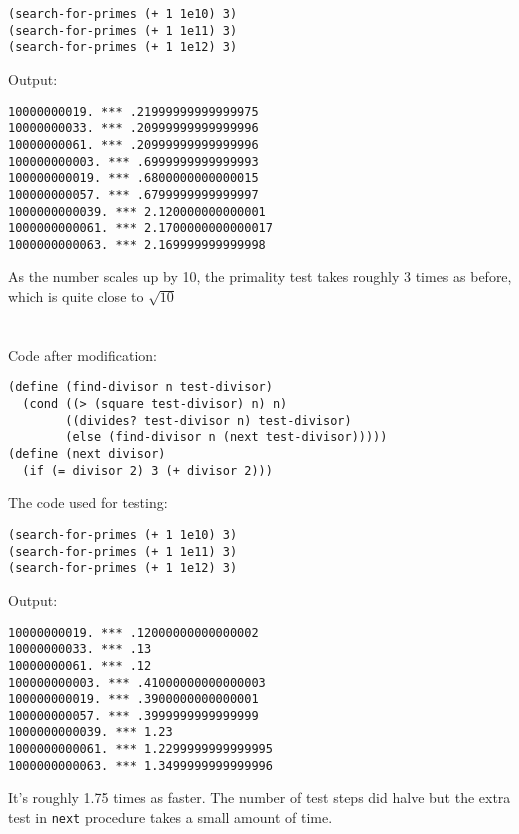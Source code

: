 \documentclass[a4paper]{report}
\begin{document}
\begin{lstlisting}
(search-for-primes (+ 1 1e10) 3)
(search-for-primes (+ 1 1e11) 3)
(search-for-primes (+ 1 1e12) 3)
\end{lstlisting}

Output:

\begin{lstlisting}
10000000019. *** .21999999999999975
10000000033. *** .20999999999999996
10000000061. *** .20999999999999996
100000000003. *** .6999999999999993
100000000019. *** .6800000000000015
100000000057. *** .6799999999999997
1000000000039. *** 2.120000000000001
1000000000061. *** 2.1700000000000017
1000000000063. *** 2.169999999999998
\end{lstlisting}

As the number scales up by 10, the primality
 test takes roughly 3 times as before, which is
 quite close to $\sqrt{10}$


\section{}

Code after modification:

\begin{lstlisting}
(define (find-divisor n test-divisor)
  (cond ((> (square test-divisor) n) n)
        ((divides? test-divisor n) test-divisor)
        (else (find-divisor n (next test-divisor)))))
(define (next divisor)
  (if (= divisor 2) 3 (+ divisor 2)))
\end{lstlisting}

The code used for testing:

\begin{lstlisting}
(search-for-primes (+ 1 1e10) 3)
(search-for-primes (+ 1 1e11) 3)
(search-for-primes (+ 1 1e12) 3)
\end{lstlisting}

Output:

\begin{lstlisting}
10000000019. *** .12000000000000002
10000000033. *** .13
10000000061. *** .12
100000000003. *** .41000000000000003
100000000019. *** .3900000000000001
100000000057. *** .3999999999999999
1000000000039. *** 1.23
1000000000061. *** 1.2299999999999995
1000000000063. *** 1.3499999999999996
\end{lstlisting}

It's roughly 1.75 times as faster. The number of test steps
 did halve but the extra test in \lstinline{next} procedure
 takes a small amount of time.
\end{document}
